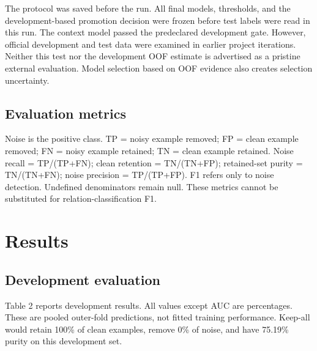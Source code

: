 \documentclass[11pt]{article}
\begin{document}
The protocol was saved before the run. All final models, thresholds, and the development-based promotion decision were frozen before test labels were read in this run. The context model passed the predeclared development gate. However, official development and test data were examined in earlier project iterations. Neither this test nor the development OOF estimate is advertised as a pristine external evaluation. Model selection based on OOF evidence also creates selection uncertainty.

\subsection{Evaluation metrics}

Noise is the positive class. TP = noisy example removed; FP = clean example removed; FN = noisy example retained; TN = clean example retained. Noise recall = TP/(TP+FN); clean retention = TN/(TN+FP); retained-set purity = TN/(TN+FN); noise precision = TP/(TP+FP). F1 refers only to noise detection. Undefined denominators remain null. These metrics cannot be substituted for relation-classification F1.



\section{Results}\subsection{Development evaluation}

Table 2 reports development results. All values except AUC are percentages. These are pooled outer-fold predictions, not fitted training performance. Keep-all would retain 100\% of clean examples, remove 0\% of noise, and have 75.19\% purity on this development set.

\begin{table}[t]\centering\small
{}
\caption{Development results under Retain90; percentages except AUC.}
\end{table}
\end{document}
